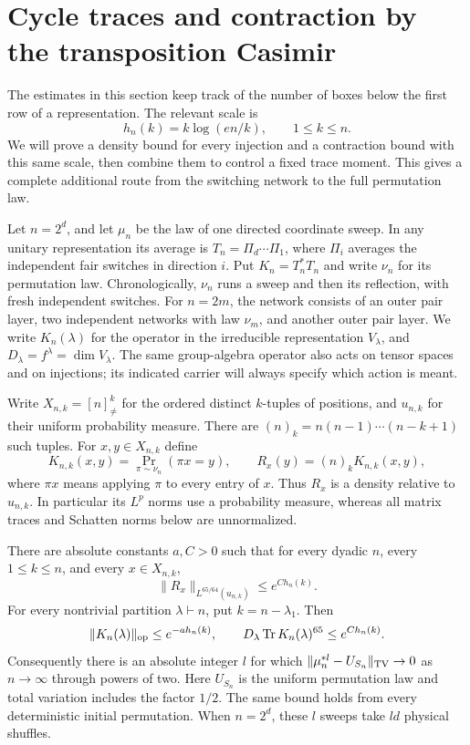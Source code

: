 \section{Cycle traces and contraction by the transposition Casimir}\label{sec:casimir}
The estimates in this section keep track of the number of boxes below the
first row of a representation.  The relevant scale is
\[
 h_n(k)=k\log(en/k),\qquad 1\le k\le n.
\]
We will prove a density bound for every injection and a contraction bound
with this same scale, then combine them to control a fixed trace moment.
This gives a complete additional route from the switching network to the
full permutation law.

Let $n=2^d$, and let $\mu_n$ be the law of one directed coordinate sweep.
In any unitary representation its average is
$T_n=\Pi_d\cdots\Pi_1$, where $\Pi_i$ averages the independent fair
switches in direction $i$.  Put $K_n=T_n^*T_n$ and write $\nu_n$ for its
permutation law.  Chronologically, $\nu_n$ runs a sweep and then its
reflection, with fresh independent switches.  For $n=2m$, the network
consists of an outer pair layer, two independent networks with law
$\nu_m$, and another outer pair layer.  We write $K_n(\lambda)$ for the
operator in the irreducible representation $V_\lambda$, and
$D_\lambda=f^\lambda=\dim V_\lambda$.  The same group-algebra operator
also acts on tensor spaces and on injections; its indicated carrier will
always specify which action is meant.

Write $X_{n,k}=[n]_{\ne}^k$ for the ordered distinct $k$-tuples of positions,
and $u_{n,k}$ for their uniform probability measure.  There are
$(n)_k=n(n-1)\cdots(n-k+1)$ such tuples.  For $x,y\in X_{n,k}$ define
\[
 K_{n,k}(x,y)=\Pr_{\pi\sim\nu_n}(\pi x=y),\qquad
 R_x(y)=(n)_kK_{n,k}(x,y),
\]
where $\pi x$ means applying $\pi$ to every entry of $x$.  Thus $R_x$ is
a density relative to $u_{n,k}$.  In particular its $L^p$ norms use a
probability measure, whereas all matrix traces and Schatten norms below
are unnormalized.

\begin{theorem}\label{cas:main}
There are absolute constants $a,C>0$ such that for every dyadic $n$,
every $1\le k\le n$, and every $x\in X_{n,k}$,
\[
 \|R_x\|_{L^{65/64}(u_{n,k})}\le e^{C h_n(k)}.
\]
For every nontrivial partition $\lambda\vdash n$, put $k=n-\lambda_1$.
Then
\[
 \|K_n(\lambda)\|_{\mathrm{op}}\le e^{-a h_n(k)},\qquad
 D_\lambda\operatorname{Tr} K_n(\lambda)^{65}\le e^{C h_n(k)}.
\]
Consequently there is an absolute integer $l$ for which
$\|\mu_n^{*l}-U_{S_n}\|_{\mathrm{TV}}\to0$ as $n\to\infty$ through powers of two.
Here $U_{S_n}$ is the uniform permutation law and total variation includes
the factor $1/2$.  The same bound holds from every deterministic initial
permutation.  When $n=2^d$, these $l$ sweeps take $ld$ physical shuffles.
\end{theorem}


